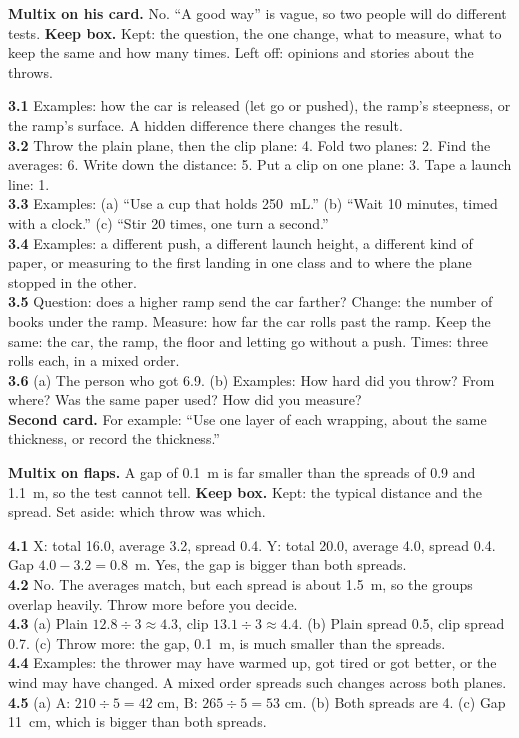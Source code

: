 \textbf{Multix on his card.} No. ``A good way'' is vague, so two people will do different tests. \textbf{Keep box.} Kept: the question, the one change, what to measure, what to keep the same and how many times. Left off: opinions and stories about the throws.

\textbf{3.1} Examples: how the car is released (let go or pushed), the ramp's steepness, or the ramp's surface. A hidden difference there changes the result.\\
\textbf{3.2} Throw the plain plane, then the clip plane: 4. Fold two planes: 2. Find the averages: 6. Write down the distance: 5. Put a clip on one plane: 3. Tape a launch line: 1.\\
\textbf{3.3} Examples: (a) ``Use a cup that holds 250~mL.'' (b) ``Wait 10 minutes, timed with a clock.'' (c) ``Stir 20 times, one turn a second.''\\
\textbf{3.4} Examples: a different push, a different launch height, a different kind of paper, or measuring to the first landing in one class and to where the plane stopped in the other.\\
\textbf{3.5} Question: does a higher ramp send the car farther? Change: the number of books under the ramp. Measure: how far the car rolls past the ramp. Keep the same: the car, the ramp, the floor and letting go without a push. Times: three rolls each, in a mixed order.\\
\textbf{3.6} (a) The person who got 6.9. (b) Examples: How hard did you throw? From where? Was the same paper used? How did you measure?\\
\textbf{Second card.} For example: ``Use one layer of each wrapping, about the same thickness, or record the thickness.''

\textbf{Multix on flaps.} A gap of 0.1~m is far smaller than the spreads of 0.9 and 1.1~m, so the test cannot tell. \textbf{Keep box.} Kept: the typical distance and the spread. Set aside: which throw was which.

\textbf{4.1} X: total 16.0, average 3.2, spread 0.4. Y: total 20.0, average 4.0, spread 0.4. Gap $4.0-3.2=0.8$~m. Yes, the gap is bigger than both spreads.\\
\textbf{4.2} No. The averages match, but each spread is about 1.5~m, so the groups overlap heavily. Throw more before you decide.\\
\textbf{4.3} (a) Plain $12.8\div3\approx4.3$, clip $13.1\div3\approx4.4$. (b) Plain spread 0.5, clip spread 0.7. (c) Throw more: the gap, 0.1~m, is much smaller than the spreads.\\
\textbf{4.4} Examples: the thrower may have warmed up, got tired or got better, or the wind may have changed. A mixed order spreads such changes across both planes.\\
\textbf{4.5} (a) A: $210\div5=42$ cm, B: $265\div5=53$ cm. (b) Both spreads are 4. (c) Gap 11~cm, which is bigger than both spreads.

